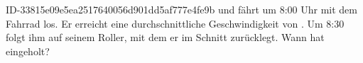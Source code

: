 \begin{exercise}
      {ID-33815e09e5ea2517640056d901dd5af777e4fe9b}
      {\xye{} und \xyf}
  \ifproblem\problem
    \xye{} fährt um 8:00 Uhr mit dem Fahrrad los. Er erreicht eine durchschnittliche
    Geschwindigkeit von . Um 8:30 folgt ihm \xyf{} auf seinem Roller, mit
    dem er  im Schnitt zurücklegt. Wann hat \xyf{} \xye{} eingeholt?
  \fi
\end{exercise}
